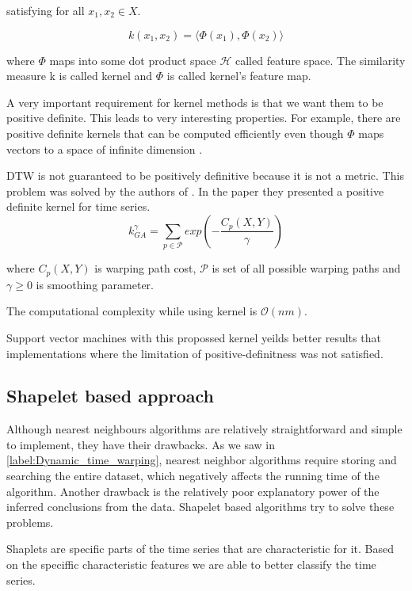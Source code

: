 \documentclass[thesis=M,english]{FITthesis}[2019/12/23]
\begin{document}
satisfying for all $x_1, x_2 \in X$.

\begin{equation*}
k(x_1,x_2) = \langle \Phi(x_1),\Phi(x_2) \rangle
\end{equation*}

where $\Phi$ maps into some dot product space $\mathcal{H}$ called feature space. The similarity measure k is called kernel and $\Phi$ is called kernel's feature map.

A very important requirement for kernel methods is that we want them to be positive definite. This leads to very interesting properties. For example, there are positive definite kernels that can be computed efficiently even though $\Phi$ maps vectors to a space of infinite dimension \cite{kernel_theory}.

DTW is not guaranteed to be positively definitive because it is not a metric. This problem was solved by the authors of \cite{Cuturi}. In the paper they presented a positive definite kernel for time series.
\begin{equation*}
k_{GA}^{\gamma} = \sum_{p\in \mathcal{P}} exp(-\frac{C_p(X,Y)}{\gamma})
\end{equation*}

where $C_p(X,Y)$ is warping path cost, $\mathcal{P}$ is set of all possible warping paths and $\gamma \geq 0$ is smoothing parameter.

The computational complexity while using kernel is $\mathcal{O}(nm)$.

Support vector machines with this propossed kernel yeilds better results that implementations where the limitation of positive-definitness was not satisfied.


\subsection{Shapelet based approach}
Although nearest neighbours algorithms are relatively straightforward and simple to implement, they have their drawbacks. As we saw in \ref{label:Dynamic_time_warping}, nearest neighbor algorithms require storing and searching the entire dataset, which negatively affects the running time of the algorithm. Another drawback is the relatively poor explanatory power of the inferred conclusions from the data. Shapelet based algorithms try to solve these problems.

Shaplets are specific parts of the time series that are characteristic for it. Based on the speciffic characteristic features we are able to better classify the time series. 
\end{document}
